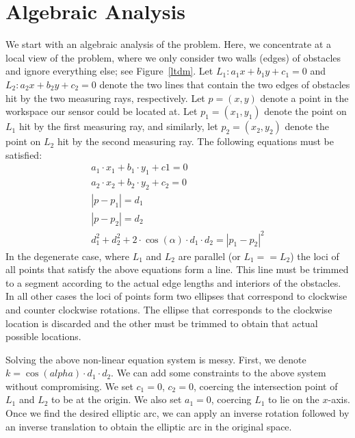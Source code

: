 \section{Algebraic Analysis}
\label{sec:analysis}
We start with an algebraic analysis of the problem. Here, we concentrate at a local view of the problem, where we only consider two walls (edges) of obstacles and ignore everything else; see Figure~\ref{ltdm}. Let $L_1: a_1 x + b_1 y + c_1 = 0$ and $L_2: a_2 x + b_2 y + c_2 = 0$ denote the two lines that contain the two edges of obstacles hit by the two measuring rays, respectively. Let $p = (x,y)$ denote a point in the workspace our sensor could be located at. Let $p_1 = (x_1,y_1)$ denote the point on $L_1$ hit by the first measuring ray, and similarly, let $p_2 = (x_2,y_2)$ denote the point on $L_2$ hit by the second measuring ray. The following equations must be satisfied:
\begin{gather*}
  a_1\cdot x_1 + b_1\cdot y_1 + c1 = 0\\
  a_2\cdot x_2 + b_2\cdot y_2 + c_2 = 0\\
  |p - p_1| = d_1\\
  |p - p_2| = d_2\\
  d_1^2 + d_2^2 + 2\cdot \cos(\alpha)\cdot d_1\cdot d_2 = |p_1 - p_2|^2
\end{gather*}
In the degenerate case, where $L_1$ and $L_2$ are parallel (or $L_1 == L_2$) the loci of all points that satisfy the above equations form a line. This line must be trimmed to a segment according to the actual edge lengths and interiors of the obstacles. In all other cases the loci of points form two ellipses that correspond to clockwise and counter clockwise rotations. The ellipse that corresponds to the clockwise location is discarded and the other must be trimmed to obtain that actual possible locations.

Solving the above non-linear equation system is messy. First, we denote $k = \cos(alpha)\cdot d_1\cdot d_2$. We can add some constraints to the above system without compromising. We set $c_1 = 0$, $c_2 = 0$, coercing the intersection point of $L_1$ and $L_2$ to be at the origin. We also set $a_1 = 0$, coercing $L_1$ to lie on the $x$-axis. Once we find the desired elliptic arc, we can apply an inverse rotation followed by an inverse translation to obtain the elliptic arc in the original space.

